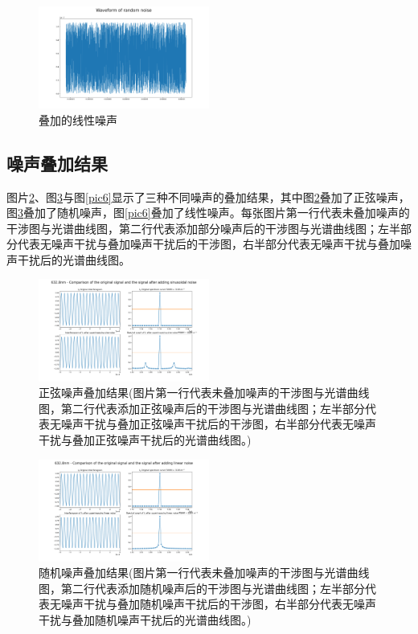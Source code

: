 \documentclass[conference]{IEEEtran}
\begin{document}
\begin{figure}[htbp]
    \centerline{\includegraphics[width=0.5\textwidth]{pic3.png}}
    \caption{叠加的线性噪声}
    \label{pic3}
\end{figure}

\subsection{噪声叠加结果}
图片\ref{pic4}、图\ref{pic5}与图\ref{pic6}显示了三种不同噪声的叠加结果，其中图\ref{pic4}叠加了正弦噪声，图\ref{pic5}叠加了随机噪声，图\ref{pic6}叠加了线性噪声。每张图片第一行代表未叠加噪声的干涉图与光谱曲线图，第二行代表添加部分噪声后的干涉图与光谱曲线图；左半部分代表无噪声干扰与叠加噪声干扰后的干涉图，右半部分代表无噪声干扰与叠加噪声干扰后的光谱曲线图。

\begin{figure}[htbp]
    \centerline{\includegraphics[width=0.5\textwidth]{pic4.png}}
    \caption{正弦噪声叠加结果(图片第一行代表未叠加噪声的干涉图与光谱曲线图，第二行代表添加正弦噪声后的干涉图与光谱曲线图；左半部分代表无噪声干扰与叠加正弦噪声干扰后的干涉图，右半部分代表无噪声干扰与叠加正弦噪声干扰后的光谱曲线图。)}
    \label{pic4}
\end{figure}

\begin{figure}[htbp]
    \centerline{\includegraphics[width=0.5\textwidth]{pic5.png}}
    \caption{随机噪声叠加结果(图片第一行代表未叠加噪声的干涉图与光谱曲线图，第二行代表添加随机噪声后的干涉图与光谱曲线图；左半部分代表无噪声干扰与叠加随机噪声干扰后的干涉图，右半部分代表无噪声干扰与叠加随机噪声干扰后的光谱曲线图。)}
    \label{pic5}
\end{figure}
\end{document}
